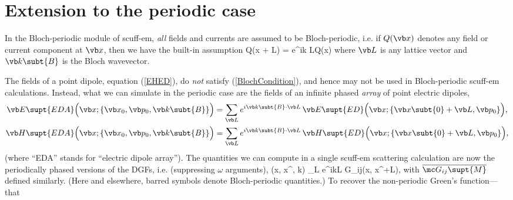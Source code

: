 \documentclass[letterpaper]{article}
\begin{document}
\section{Extension to the periodic case}

In the Bloch-periodic module of {\sc scuff-em}, \textit{all}
fields and currents are assumed to be Bloch-periodic, i.e.
if $Q(\vb x)$ denotes any field or current component at $\vb x$,
then we have the built-in assumption
{Q(\vb x + \vb L) = e^{i\vb k \cdot \vb L}Q(\vb x)}
where $\vb L$ is any lattice vector and 
$\vb k\subt{B}$ is the Bloch wavevector.

The fields of a point dipole, equation (\ref{EHED}), do \textit{not}
satisfy (\ref{BlochCondition}), and hence may not be used in
Bloch-periodic {\sc scuff-em} calculations. Instead, what we can 
simulate in the periodic case are the fields of an infinite
phased \textit{array} of point electric dipoles,
\begin{subequations}
\begin{align}
 \vb E\supt{EDA}\Big(\vb x; \{ \vb x_0, \vb p_0, \vb k\subt{B}\}\Big)
&=\sum_{\vb L} e^{i\vb k\subt{B}\cdot \vb L}
  \, \vb E\supt{ED}\Big(\vb x; \{\vb x\subt{0}+\vb L, \vb p_0\} \Big),
\\
 \vb H\supt{EDA}\Big(\vb x; \{ \vb x_0, \vb p_0, \vb k\subt{B}\}\Big)
&=\sum_{\vb L} e^{i\vb k\subt{B}\cdot \vb L}
  \, \vb H\supt{ED}\Big(\vb x; \{\vb x\subt{0}+\vb L, \vb p_0\} \Big),
\end{align}
\label{EHEDA}
\end{subequations}
(where ``EDA'' stands for ``electric dipole array''). The quantities
we can compute in a single {\sc scuff-em} scattering calculation
are now the periodically phased versions of the DGFs, i.e.
(suppressing $\omega$ arguments),
{
 (\vb x, \vb x^\prime, \vb k)
 \equiv \sum_{\vb L} e^{i\vb k\cdot \vb L}
  \mc G_{ij}(\vb x, \vb x^\prime+\vb L), 
}
with $\overline{\mc G_{ij}\supt{M}}$ defined similarly.
(Here and elsewhere, barred symbols denote Bloch-periodic 
quantities.) To recover the non-periodic Green's function---that
\end{document}
